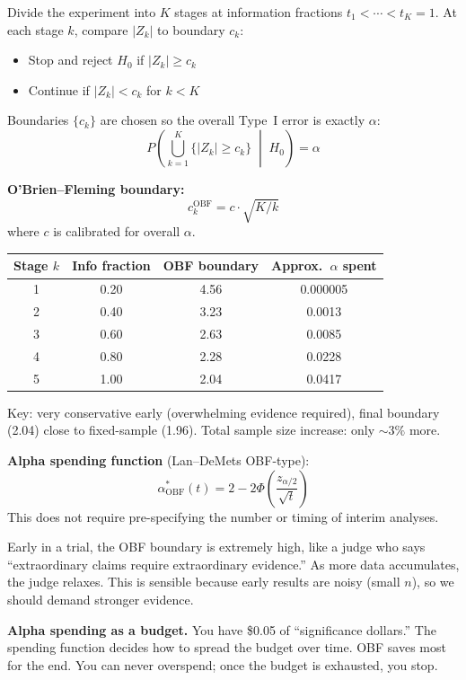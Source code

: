 \documentclass[11pt,a4paper]{article}
\begin{document}
\begin{formaldef}
Divide the experiment into $K$ stages at information fractions $t_1 < \cdots < t_K = 1$. At each stage $k$, compare $|Z_k|$ to boundary $c_k$:
\begin{itemize}[nosep]
  \item Stop and reject $H_0$ if $|Z_k| \geq c_k$
  \item Continue if $|Z_k| < c_k$ for $k < K$
\end{itemize}

Boundaries $\{c_k\}$ are chosen so the overall Type~I error is exactly $\alpha$:
\[
P\!\left(\bigcup_{k=1}^{K}\{|Z_k| \geq c_k\} \;\middle|\; H_0\right) = \alpha
\]

\textbf{O'Brien--Fleming boundary:}
\[
c_k^{\mathrm{OBF}} = c \cdot \sqrt{K/k}
\]
where $c$ is calibrated for overall $\alpha$.

\medskip
\begin{tabular}{@{}cccc@{}}
\toprule
Stage $k$ & Info fraction & OBF boundary & Approx.\ $\alpha$ spent \\
\midrule
1 & 0.20 & 4.56 & 0.000005 \\
2 & 0.40 & 3.23 & 0.0013 \\
3 & 0.60 & 2.63 & 0.0085 \\
4 & 0.80 & 2.28 & 0.0228 \\
5 & 1.00 & 2.04 & 0.0417 \\
\bottomrule
\end{tabular}

\medskip
Key: very conservative early (overwhelming evidence required), final boundary (2.04) close to fixed-sample (1.96). Total sample size increase: only ${\sim}3\%$ more.

\medskip
\textbf{Alpha spending function} (Lan--DeMets OBF-type):
\[
\alpha^*_{\mathrm{OBF}}(t) = 2 - 2\Phi\!\left(\frac{z_{\alpha/2}}{\sqrt{t}}\right)
\]
This does not require pre-specifying the number or timing of interim analyses.
\end{formaldef}

\vspace{8pt}

\begin{intuition}
Early in a trial, the OBF boundary is extremely high, like a judge who says ``extraordinary claims require extraordinary evidence.'' As more data accumulates, the judge relaxes. This is sensible because early results are noisy (small $n$), so we should demand stronger evidence.

\medskip
\textbf{Alpha spending as a budget.} You have \$0.05 of ``significance dollars.'' The spending function decides how to spread the budget over time. OBF saves most for the end. You can never overspend; once the budget is exhausted, you stop.
\end{intuition}
\end{document}

